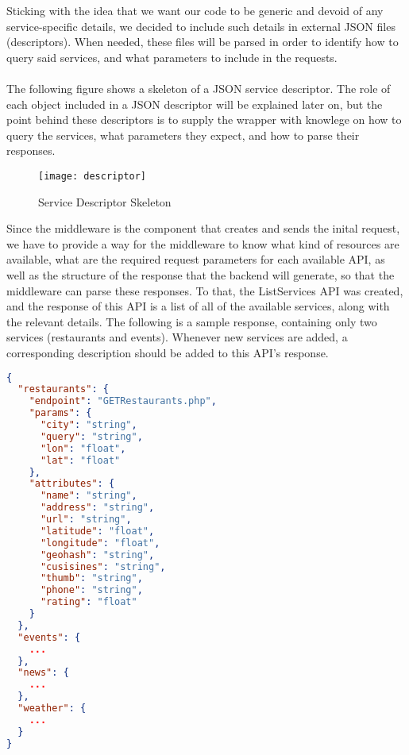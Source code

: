 Sticking with the idea that we want our code to be generic and devoid of any service-specific details, we decided to include such details in external JSON files (descriptors). When needed, these files will be parsed in order to identify how to query said services, and what parameters to include in the requests.\\\\
The following figure shows a skeleton of a JSON service descriptor. The role of each object included in a JSON descriptor will be explained later on, but the point behind these descriptors is to supply the wrapper with knowlege on how to query the services, what parameters they expect, and how to parse their responses.
\newpage
\begin{figure}[h]
\centering
\texttt{[image: descriptor]}
\caption{Service Descriptor Skeleton}
\end{figure}
\noindent Since the middleware is the component that creates and sends the inital request, we have to provide a way for the middleware to know what kind of resources are available, what are the required request parameters for each available API, as well as the structure of the response that the backend will generate, so that the middleware can parse these responses. To that, the ListServices API was created, and the response of this API is a list of all of the available services, along with the relevant details. The following is a sample response, containing only two services (restaurants and events). Whenever new services are added, a corresponding description should be added to this API's response.
\newpage
\begin{lstlisting}[language=json,firstnumber=1]
{
  "restaurants": {
    "endpoint": "GETRestaurants.php",
    "params": {
      "city": "string",
      "query": "string",
      "lon": "float",
      "lat": "float"
    },
    "attributes": {
      "name": "string",
      "address": "string",
      "url": "string",
      "latitude": "float",
      "longitude": "float",
      "geohash": "string",
      "cusisines": "string",
      "thumb": "string",
      "phone": "string",
      "rating": "float"
    }
  },
  "events": {
    ...
  },
  "news": {
    ...
  },
  "weather": {
    ...
  }
}
\end{lstlisting}
\pagebreak
